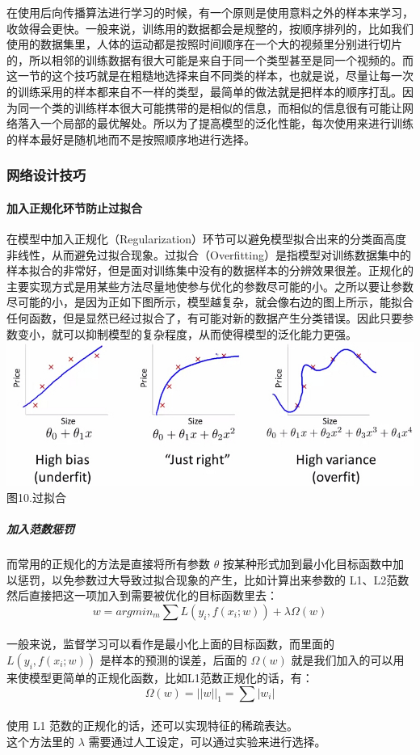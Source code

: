 在使用后向传播算法进行学习的时候，有一个原则是使用意料之外的样本来学习，收敛得会更快。一般来说，训练用的数据都会是规整的，按顺序排列的，比如我们使用的数据集里，人体的运动都是按照时间顺序在一个大的视频里分别进行切片的，所以相邻的训练数据有很大可能是来自于同一个类型甚至是同一个视频的。而这一节的这个技巧就是在粗糙地选择来自不同类的样本，也就是说，尽量让每一次的训练采用的样本都来自不一样的类型，最简单的做法就是把样本的顺序打乱。因为同一个类的训练样本很大可能携带的是相似的信息，而相似的信息很有可能让网络落入一个局部的最优解处。所以为了提高模型的泛化性能，每次使用来进行训练的样本最好是随机地而不是按照顺序地进行选择。

\subsubsection{网络设计技巧}\label{ux7f51ux7edcux8bbeux8ba1ux6280ux5de7}

\paragraph{加入正规化环节防止过拟合}\label{ux52a0ux5165ux6b63ux89c4ux5316ux73afux8282ux9632ux6b62ux8fc7ux62dfux5408}

在模型中加入正规化（Regularization）环节可以避免模型拟合出来的分类面高度非线性，从而避免过拟合现象。过拟合（Overfitting）是指模型对训练数据集中的样本拟合的非常好，但是面对训练集中没有的数据样本的分辨效果很差。正规化的主要实现方式是用某些方法尽量地使参与优化的参数尽可能的小。之所以要让参数尽可能的小，是因为正如下图所示，模型越复杂，就会像右边的图上所示，能拟合任何函数，但是显然已经过拟合了，有可能对新的数据产生分类错误。因此只要参数变小，就可以抑制模型的复杂程度，从而使得模型的泛化能力更强。\\\includegraphics{picture/overfit.jpg}\\图10.过拟合

\subparagraph{加入范数惩罚}\label{ux52a0ux5165ux8303ux6570ux60e9ux7f5a}

而常用的正规化的方法是直接将所有参数 \(θ\)
按某种形式加到最小化目标函数中加以惩罚，以免参数过大导致过拟合现象的产生，比如计算出来参数的
L1、L2范数然后直接把这一项加入到需要被优化的目标函数里去：
\[w = arg min_m\sum L(y_i,f(x_i;w))+\lambda \Omega(w)\]\\一般来说，监督学习可以看作是最小化上面的目标函数，而里面的
\(L(y_i,f(x_i;w))\) 是样本的预测的误差，后面的 \(\Omega(w)\)
就是我们加入的可以用来使模型更简单的正规化函数，比如L1范数正规化的话，有：
\[\Omega(w) = ||w||_1 = \sum|w_i|\]\\使用 L1
范数的正规化的话，还可以实现特征的稀疏表达。\\这个方法里的 \(\lambda\)
需要通过人工设定，可以通过实验来进行选择。

